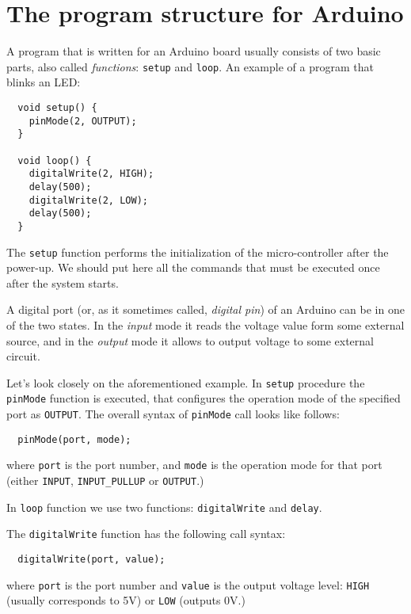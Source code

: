 \documentclass[../sparc.tex]{subfiles}
\begin{document}
\section{The program structure for Arduino}

A program that is written for an Arduino board usually consists of two basic
parts, also called \emph{functions}: \texttt{setup} and \texttt{loop}.  An
example of a program that blinks an LED:

\begin{verbatim}
  void setup() {
    pinMode(2, OUTPUT);
  }

  void loop() {
    digitalWrite(2, HIGH);
    delay(500);
    digitalWrite(2, LOW);
    delay(500);
  }
\end{verbatim}


The \texttt{setup} function performs the initialization of the micro-controller
after the power-up.  We should put here all the commands that must be executed
once after the system starts.

A digital port (or, as it sometimes called, \emph{digital pin}) of an Arduino
can be in one of the two states.  In the \emph{input} mode it reads the voltage
value form some external source, and in the \emph{output} mode it allows to
output voltage to some external circuit.

Let's look closely on the aforementioned example.  In \texttt{setup} procedure
the \texttt{pinMode} function is executed, that configures the operation mode of
the specified port as \texttt{OUTPUT}.  The overall syntax of \texttt{pinMode}
call looks like follows:

\begin{verbatim}
  pinMode(port, mode);
\end{verbatim}

where \texttt{port} is the port number, and \texttt{mode} is the operation mode
for that port (either \texttt{INPUT}, \texttt{INPUT\_PULLUP} or
\texttt{OUTPUT}.)

In \texttt{loop} function we use two functions: \texttt{digitalWrite} and
\texttt{delay}.

The \texttt{digitalWrite} function has the following call syntax:

\begin{verbatim}
  digitalWrite(port, value);
\end{verbatim}

where \texttt{port} is the port number and \texttt{value} is the output voltage
level: \texttt{HIGH} (usually corresponds to 5V) or \texttt{LOW} (outputs 0V.)
\end{document}
